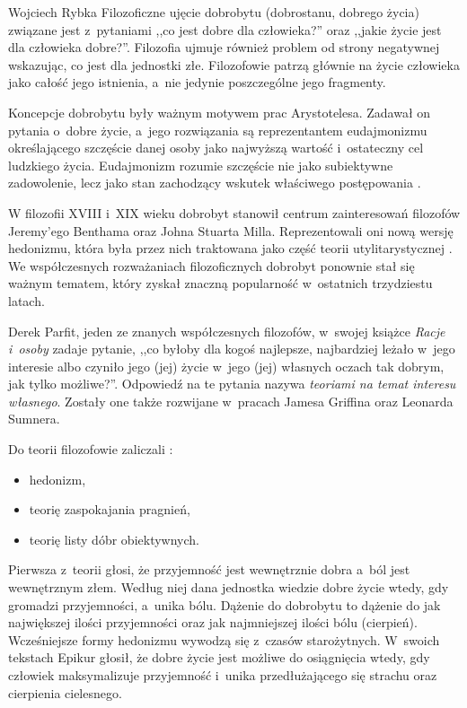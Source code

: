 \begin{artplenv}{Wojciech Rybka}
Filozoficzne ujęcie dobrobytu (dobrostanu, dobrego życia) związane jest z~pytaniami ,,co jest dobre dla człowieka?'' oraz
,,jakie życie jest dla człowieka dobre?''. Filozofia ujmuje również problem od strony negatywnej wskazując, co jest dla
jednostki złe. Filozofowie patrzą głównie na życie człowieka jako całość jego istnienia, a~nie jedynie poszczególne
jego fragmenty. 

Koncepcje dobrobytu były ważnym motywem prac Arystotelesa. Zadawał on pytania o~dobre życie, a~jego rozwiązania są
reprezentantem eudajmonizmu określającego szczęście danej osoby jako najwyższą wartość i~ostateczny cel ludzkiego
życia. Eudajmonizm rozumie szczęście nie jako subiektywne zadowolenie, lecz jako stan zachodzący wskutek właściwego
postępowania
\parencite{moleda_kantowska_2009}.

W filozofii XVIII i~XIX wieku dobrobyt stanowił centrum zainteresowań filozofów Jeremy'ego Benthama oraz Johna Stuarta
Milla. Reprezentowali oni nową wersję hedonizmu, która była przez nich traktowana jako część teorii utylitarystycznej
\parencite{brey_well-being_2012}.
We współczesnych rozważaniach filozoficznych dobrobyt ponownie stał się ważnym
tematem, który zyskał znaczną popularność w~ostatnich trzydziestu latach.

Derek Parfit, jeden ze znanych współczesnych filozofów, w~swojej książce \textit{Racje i~osoby}
\parencite*{parfit_racje_2012}
zadaje pytanie, ,,co byłoby dla kogoś najlepsze, najbardziej leżało w~jego interesie
albo czyniło jego (jej) życie w~jego (jej) własnych oczach tak dobrym, jak tylko możliwe?''. Odpowiedź na te pytania
nazywa \textit{teoriami na temat interesu własnego}. Zostały one także rozwijane w~pracach Jamesa Griffina oraz
Leonarda Sumnera. 

Do teorii filozofowie zaliczali
\parencite{brey_well-being_2012}:

\begin{itemize}
\item hedonizm,
\item teorię zaspokajania pragnień,
\item teorię listy dóbr obiektywnych.
\end{itemize}

Pierwsza z~teorii głosi, że przyjemność jest wewnętrznie dobra a~ból jest wewnętrznym złem. Według niej dana jednostka
wiedzie dobre życie wtedy, gdy gromadzi przyjemności, a~unika bólu. Dążenie do dobrobytu to dążenie do jak największej
ilości przyjemności oraz jak najmniejszej ilości bólu (cierpień). Wcześniejsze formy hedonizmu wywodzą się z~czasów
starożytnych. W~swoich tekstach Epikur głosił, że dobre życie jest możliwe do osiągnięcia wtedy, gdy człowiek
maksymalizuje przyjemność i~unika przedłużającego się strachu oraz cierpienia cielesnego. 


\end{artplenv}
